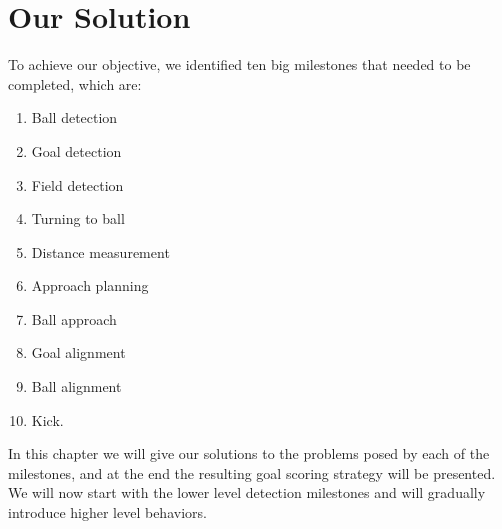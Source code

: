 \chapter{Our Solution}

To achieve our objective, we identified ten big milestones that needed to be
completed, which are:

\begin{enumerate}

  \item Ball detection

  \item Goal detection

  \item Field detection

  \item Turning to ball

  \item Distance measurement

  \item Approach planning

  \item Ball approach

  \item Goal alignment

  \item Ball alignment

  \item Kick.

\end{enumerate}

In this chapter we will give our solutions to the problems posed by each of the
milestones, and at the end the resulting goal scoring strategy will be
presented. We will now start with the lower level detection milestones and
will gradually introduce higher level behaviors.
